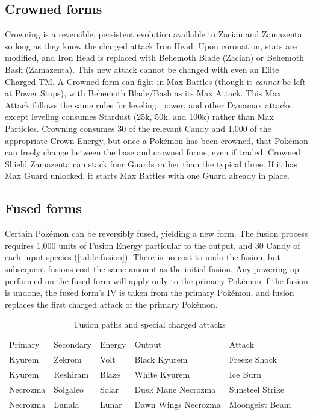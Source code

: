 \subsection{Crowned forms\label{sec:crowned}}
Crowning is a reversible, persistent evolution available to Zacian and Zamazenta
 so long as they know the charged attack Iron Head.
Upon coronation, stats are modified, and Iron Head is replaced with Behemoth Blade (Zacian)
  or Behemoth Bash (Zamazenta).
This new attack cannot be changed with even an Elite Charged TM\@.
A Crowned form can fight in Max Battles (though it \textit{cannot} be left at Power Stops), with Behemoth Blade/Bash as its Max Attack.
This Max Attack follows the same rules for leveling, power, and other Dynamax attacks,
 except leveling consumes Stardust (25k, 50k, and 100k) rather than Max Particles.
Crowning consumes 30 of the relevant Candy and 1,000 of the appropriate
  Crown Energy, but once a Pokémon has been crowned, that Pokémon can freely
  change between the base and crowned forms, even if traded.
Crowned Shield Zamazenta can stack four Guards rather than the typical three.
If it has Max Guard unlocked, it starts Max Battles with one Guard already in place.

\subsection{Fused forms\label{sec:fusion}}
Certain Pokémon can be reversibly fused, yielding a new form.
The fusion process requires 1,000 units of Fusion Energy particular to the output,
 and 30 Candy of each input species (\autoref{table:fusion}).
There is no cost to undo the fusion, but subsequent fusions cost the same amount as the initial fusion.
Any powering up performed on the fused form will apply only to the primary
  Pokémon if the fusion is undone, the fused form's IV is taken from the primary Pokémon,
  and fusion replaces the first charged attack of the primary Pokémon.

\begin{table}[ht]
\centering
\footnotesize
\begin{tabular}{lllll}
Primary & Secondary & Energy & Output & Attack\\
\Midrule
Kyurem & Zekrom & Volt & Black Kyurem & Freeze Shock\\
Kyurem & Reshiram & Blaze & White Kyurem & Ice Burn\\
Necrozma & Solgaleo & Solar & Dusk Mane Necrozma & Sunsteel Strike\\
Necrozma & Lunala & Lunar & Dawn Wings Necrozma & Moongeist Beam\\
\end{tabular}
\caption{Fusion paths and special charged attacks\label{table:fusion}}
\end{table}

